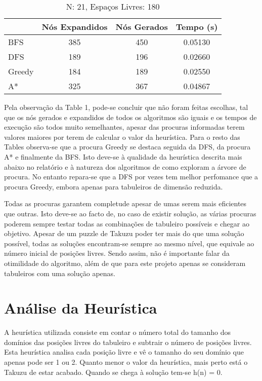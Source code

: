 \documentclass[12pt,a4paper]{article}
\begin{document}
  \begin{table}[H]
    \caption{N: 21, Espaços Livres: 180}
    \label{tab:my-table3}
    \centering
    \begin{tabular}{lccc}
      & Nós Expandidos & Nós Gerados & Tempo (s) \\
      \hline
      BFS    & 385 & 450 & 0.05130 \\
      DFS    & 189 & 196 & 0.02660 \\
      Greedy & 184 & 189 & 0.02550 \\
      A*     & 325 & 367 & 0.04867 \\
    \hline
    \end{tabular}
  \end{table}

  Pela observação da Table 1, pode-se concluir que não foram feitas escolhas, tal que os nós gerados e expandidos de todos os algoritmos são iguais e os tempos de execução são todos muito semelhantes, apesar das procuras informadas terem valores maiores por terem de calcular o valor da heurística.
  Para o resto das Tables observa-se que a procura Greedy se destaca seguida da DFS, da procura A* e finalmente da BFS.
  Isto deve-se à qualidade da heurística descrita mais abaixo no relatório e à natureza dos algoritmos de como exploram a árvore de procura.
  No entanto repara-se que a DFS por vezes tem melhor perfomance que a procura Greedy, embora apenas para tabuleiros de dimensão reduzida. 
  
  Todas as procuras garantem completude apesar de umas serem mais eficientes que outras. Isto deve-se ao facto de, no caso de existir solução, as várias procuras poderem sempre testar todas as combinações de tabuleiro possíveis e chegar ao objetivo.
  Apesar de um puzzle de Takuzu poder ter mais do que uma solução possível, todas as soluções encontram-se sempre ao mesmo nível, que equivale ao número inicial de posições livres. Sendo assim, não é importante falar da otimilidade do algoritmo, 
  além de que para este projeto apenas se consideram tabuleiros com uma solução apenas.
  
  \section{Análise da Heurística}

  A heurística utilizada consiste em contar o número total do tamanho dos domínios das posições livres do tabuleiro e subtrair o número de posições livres.
  Esta heurística analisa cada posição livre e vê o tamanho do seu domínio que apenas pode ser 1 ou 2.
  Quanto menor o valor da heurística, mais perto está o Takuzu de estar acabado.
  Quando se chega à solução tem-se h(n) = 0.
  
\end{document}
